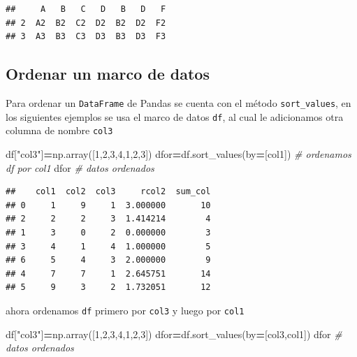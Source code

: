 \documentclass[
]{book}
\newenvironment{Shaded}{\begin{snugshade}}{\end{snugshade}}
\newcommand{\CommentTok}[1]{\textcolor[rgb]{0.56,0.35,0.01}{\textit{#1}}}
\newcommand{\DecValTok}[1]{\textcolor[rgb]{0.00,0.00,0.81}{#1}}
\newcommand{\NormalTok}[1]{#1}
\newcommand{\OperatorTok}[1]{\textcolor[rgb]{0.81,0.36,0.00}{\textbf{#1}}}
\newcommand{\StringTok}[1]{\textcolor[rgb]{0.31,0.60,0.02}{#1}}
\theoremstyle{definition}
\theoremstyle{definition}
\theoremstyle{definition}
\theoremstyle{definition}
\theoremstyle{remark}
\begin{document}
\begin{verbatim}
##     A   B   C   D   B   D   F
## 2  A2  B2  C2  D2  B2  D2  F2
## 3  A3  B3  C3  D3  B3  D3  F3
\end{verbatim}

\hypertarget{ordenar-un-marco-de-datos}{%
\subsection{Ordenar un marco de datos}\label{ordenar-un-marco-de-datos}}

Para ordenar un \texttt{DataFrame} de Pandas se cuenta con el método \texttt{sort\_values}, en los siguientes ejemplos se usa el marco de datos \texttt{df}, al cual le adicionamos otra columna de nombre \texttt{col3}

\begin{Shaded}
\begin{Highlighting}[]
\NormalTok{df[}\StringTok{"col3"}\NormalTok{]}\OperatorTok{=}\NormalTok{np.array([}\DecValTok{1}\NormalTok{,}\DecValTok{2}\NormalTok{,}\DecValTok{3}\NormalTok{,}\DecValTok{4}\NormalTok{,}\DecValTok{1}\NormalTok{,}\DecValTok{2}\NormalTok{,}\DecValTok{3}\NormalTok{])   }
\NormalTok{dfor}\OperatorTok{=}\NormalTok{df.sort\_values(by}\OperatorTok{=}\NormalTok{[}\StringTok{\textquotesingle{}col1\textquotesingle{}}\NormalTok{]) }\CommentTok{\# ordenamos df por col1 }
\NormalTok{dfor }\CommentTok{\# datos ordenados }
\end{Highlighting}
\end{Shaded}

\begin{verbatim}
##    col1  col2  col3     rcol2  sum_col
## 0     1     9     1  3.000000       10
## 2     2     2     3  1.414214        4
## 1     3     0     2  0.000000        3
## 3     4     1     4  1.000000        5
## 6     5     4     3  2.000000        9
## 4     7     7     1  2.645751       14
## 5     9     3     2  1.732051       12
\end{verbatim}

ahora ordenamos \texttt{df} primero por \texttt{col3} y luego por \texttt{col1}

\begin{Shaded}
\begin{Highlighting}[]
\NormalTok{df[}\StringTok{"col3"}\NormalTok{]}\OperatorTok{=}\NormalTok{np.array([}\DecValTok{1}\NormalTok{,}\DecValTok{2}\NormalTok{,}\DecValTok{3}\NormalTok{,}\DecValTok{4}\NormalTok{,}\DecValTok{1}\NormalTok{,}\DecValTok{2}\NormalTok{,}\DecValTok{3}\NormalTok{])   }
\NormalTok{dfor}\OperatorTok{=}\NormalTok{df.sort\_values(by}\OperatorTok{=}\NormalTok{[}\StringTok{\textquotesingle{}col3\textquotesingle{}}\NormalTok{,}\StringTok{\textquotesingle{}col1\textquotesingle{}}\NormalTok{])  }
\NormalTok{dfor }\CommentTok{\# datos ordenados }
\end{Highlighting}
\end{Shaded}
\end{document}
